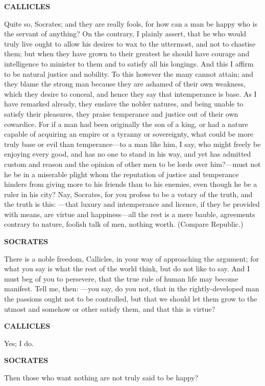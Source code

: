 \documentclass[11pt,letter]{article}
\begin{document}
\par \textbf{CALLICLES}
\par   Quite so, Socrates; and they are really fools, for how can a man be happy who is the servant of anything? On the contrary, I plainly assert, that he who would truly live ought to allow his desires to wax to the uttermost, and not to chastise them; but when they have grown to their greatest he should have courage and intelligence to minister to them and to satisfy all his longings. And this I affirm to be natural justice and nobility. To this however the many cannot attain; and they blame the strong man because they are ashamed of their own weakness, which they desire to conceal, and hence they say that intemperance is base. As I have remarked already, they enslave the nobler natures, and being unable to satisfy their pleasures, they praise temperance and justice out of their own cowardice. For if a man had been originally the son of a king, or had a nature capable of acquiring an empire or a tyranny or sovereignty, what could be more truly base or evil than temperance—to a man like him, I say, who might freely be enjoying every good, and has no one to stand in his way, and yet has admitted custom and reason and the opinion of other men to be lords over him?—must not he be in a miserable plight whom the reputation of justice and temperance hinders from giving more to his friends than to his enemies, even though he be a ruler in his city? Nay, Socrates, for you profess to be a votary of the truth, and the truth is this: —that luxury and intemperance and licence, if they be provided with means, are virtue and happiness—all the rest is a mere bauble, agreements contrary to nature, foolish talk of men, nothing worth. (Compare Republic.)

\par \textbf{SOCRATES}
\par   There is a noble freedom, Callicles, in your way of approaching the argument; for what you say is what the rest of the world think, but do not like to say. And I must beg of you to persevere, that the true rule of human life may become manifest. Tell me, then: —you say, do you not, that in the rightly-developed man the passions ought not to be controlled, but that we should let them grow to the utmost and somehow or other satisfy them, and that this is virtue?

\par \textbf{CALLICLES}
\par   Yes; I do.

\par \textbf{SOCRATES}
\par   Then those who want nothing are not truly said to be happy?
\end{document}

